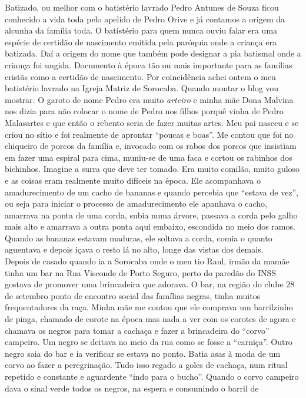\documentclass[12pt,brazil,]{book}
\begin{document}
Batizado, ou melhor com o batistério lavrado Pedro Antunes de Souza
ficou conhecido a vida toda pelo apelido de Pedro Orive e já contamos a
origem da alcunha da família toda. O batistério para quem nunca ouviu
falar era uma espécie de certidão de nascimento emitida pela paróquia
onde a criança era batizada. Daí a origem do nome que também pode
designar a pia batismal onde a criança foi ungida. Documento à época tão
ou mais importante para as famílias cristãs como a certidão de
nascimento. Por coincidência achei ontem o meu batistério lavrado na
Igreja Matriz de Sorocaba. Quando montar o blog vou mostrar. O garoto de
nome Pedro era muito \emph{arteiro} e minha mãe Dona Malvina nos dizia
para não colocar o nome de Pedro nos filhos porquê vinha de Pedro
Malasartes e que então o rebento seria de fazer muitas artes. Meu pai
nasceu e se criou no sítio e foi realmente de aprontar ``poucas e
boas''. Me contou que foi no chiqueiro de porcos da família e, invocado
com os rabos dos porcos que insistiam em fazer uma espiral para cima,
muniu-se de uma faca e cortou os rabinhos dos bichinhos. Imagine a surra
que deve ter tomado. Era muito comilão, muito guloso e as coisas eram
realmente muito difíceis na época. Ele acompanhava o amadurecimento de
um cacho de bananas e quando percebia que ``estava de vez'', ou seja
para iniciar o processo de amadurecimento ele apanhava o cacho, amarrava
na ponta de uma corda, subia numa árvore, passava a corda pelo galho
mais alto e amarrava a outra ponta aqui embaixo, escondida no meio dos
ramos. Quando as bananas estavam maduras, ele soltava a corda, comia o
quanto aguentava e depois içava o resto lá no alto, longe das vistas dos
demais.\\
Depois de casado quando ia a Sorocaba onde o meu tio Raul, irmão da
mamãe tinha um bar na Rua Visconde de Porto Seguro, perto do paredão do
INSS gostava de promover uma brincadeira que adorava. O bar, na região
do clube 28 de setembro ponto de encontro social das famílias negras,
tinha muitos frequentadores da raça. Minha mãe me contou que ele
comprava um barrilzinho de pinga, chamado de corote na época mas nada a
ver com os corotes de agora e chamava os negros para tomar a cachaça e
fazer a brincadeira do ``corvo'' campeiro. Um negro se deitava no meio
da rua como se fosse a ``carniça''. Outro negro saia do bar e ia
verificar se estava no ponto. Batia asas à moda de um corvo ao fazer a
peregrinação. Tudo isso regado a goles de cachaça, num ritual repetido e
constante e aguardente ``indo para o bucho''. Quando o corvo campeiro
dava o sinal verde todos os negros, na espera e consumindo o barril de
\end{document}
